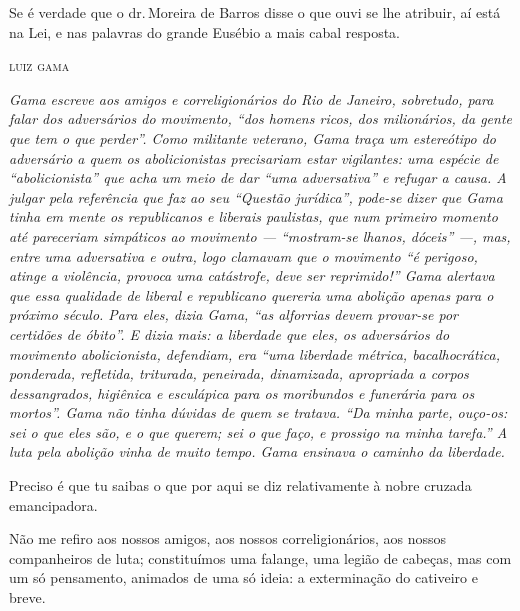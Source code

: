 Se é verdade que o dr.\,Moreira de Barros disse o que ouvi se lhe
atribuir, aí está na Lei, e nas palavras do grande Eusébio a mais cabal
resposta.

\medskip

\hfill\textsc{luiz gama}




\begin{resumo}
\emph{Gama escreve aos amigos e correligionários do Rio de Janeiro,
sobretudo, para falar dos adversários do movimento, ``dos homens ricos,
dos milionários, da gente que tem o que perder''. Como militante
veterano, Gama traça um estereótipo do adversário a quem os
abolicionistas precisariam estar vigilantes: uma espécie de
``abolicionista'' que acha um meio de dar ``uma adversativa'' e refugar a
causa. A julgar pela referência que faz ao seu ``Questão
jurídica'', pode-se dizer que Gama tinha em mente os republicanos e
liberais paulistas, que num primeiro momento até pareceriam simpáticos
ao movimento --- ``mostram-se lhanos, dóceis'' ---, mas, entre uma
adversativa e outra, logo clamavam que o movimento ``é perigoso, atinge a
violência, provoca uma catástrofe, deve ser reprimido!'' Gama alertava
que essa qualidade de liberal e republicano quereria uma abolição
apenas para o próximo século. Para eles, dizia Gama, ``as alforrias devem
provar-se por certidões de óbito''. E dizia mais: a liberdade que eles,
os adversários do movimento abolicionista, defendiam, era ``uma liberdade
métrica, bacalhocrática, ponderada, refletida, triturada, peneirada,
dinamizada, apropriada a corpos dessangrados, higiênica e esculápica
para os moribundos e funerária para os mortos''. Gama não tinha dúvidas
de quem se tratava. ``Da minha parte, ouço-os: sei o que eles são, e o
que querem; sei o que faço, e prossigo na minha tarefa.'' A luta pela
abolição vinha de muito tempo. Gama ensinava o caminho da liberdade. }
\end{resumo}

Preciso é que tu saibas o que por aqui se diz relativamente à nobre
cruzada emancipadora.

Não me refiro aos nossos amigos, aos nossos correligionários, aos nossos
companheiros de luta; constituímos uma falange, uma legião de cabeças,
mas com um só pensamento, animados de uma só ideia: a exterminação do
cativeiro e breve.

